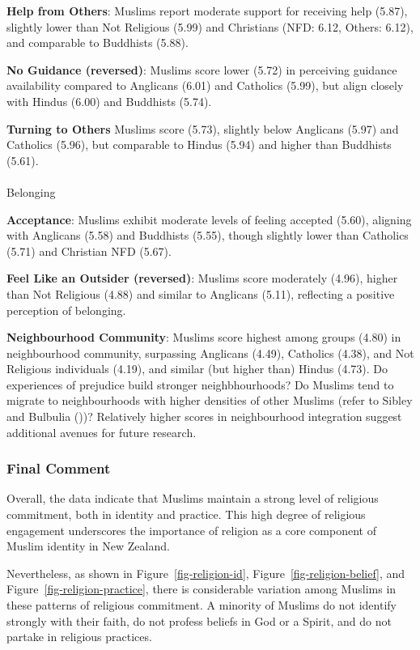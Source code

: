 \documentclass[
  single column]{article}
\makeatletter
\let\oldparagraph\paragraph
\renewcommand{\paragraph}{
    \@ifstar
      \xxxParagraphStar
      \xxxParagraphNoStar
  }
\newcommand{\xxxParagraphStar}[1]{\oldparagraph*{#1}\mbox{}}
\newcommand{\xxxParagraphNoStar}[1]{\oldparagraph{#1}\mbox{}}
\makeatother
\begin{document}
\textbf{Help from Others}: Muslims report moderate support for receiving
help (5.87), slightly lower than Not Religious (5.99) and Christians
(NFD: 6.12, Others: 6.12), and comparable to Buddhists (5.88).

\textbf{No Guidance (reversed)}: Muslims score lower (5.72) in
perceiving guidance availability compared to Anglicans (6.01) and
Catholics (5.99), but align closely with Hindus (6.00) and Buddhists
(5.74).

\textbf{Turning to Others} Muslims score (5.73), slightly below
Anglicans (5.97) and Catholics (5.96), but comparable to Hindus (5.94)
and higher than Buddhists (5.61).

\paragraph{Belonging}\label{belonging}

\textbf{Acceptance}: Muslims exhibit moderate levels of feeling accepted
(5.60), aligning with Anglicans (5.58) and Buddhists (5.55), though
slightly lower than Catholics (5.71) and Christian NFD (5.67).

\textbf{Feel Like an Outsider (reversed)}: Muslims score moderately
(4.96), higher than Not Religious (4.88) and similar to Anglicans
(5.11), reflecting a positive perception of belonging.

\textbf{Neighbourhood Community}: Muslims score highest among groups
(4.80) in neighbourhood community, surpassing Anglicans (4.49),
Catholics (4.38), and Not Religious individuals (4.19), and similar (but
higher than) Hindus (4.73). Do experiences of prejudice build stronger
neighbhourhoods? Do Muslims tend to migrate to neighbourhoods with
higher densities of other Muslims (refer to Sibley and Bulbulia
())? Relatively higher scores
in neighbourhood integration suggest additional avenues for future
research.

\subsubsection{Final Comment}\label{final-comment}

Overall, the data indicate that Muslims maintain a strong level of
religious commitment, both in identity and practice. This high degree of
religious engagement underscores the importance of religion as a core
component of Muslim identity in New Zealand.

Nevertheless, as shown in Figure~\ref{fig-religion-id},
Figure~\ref{fig-religion-belief}, and
Figure~\ref{fig-religion-practice}, there is considerable variation
among Muslims in these patterns of religious commitment. A minority of
Muslims do not identify strongly with their faith, do not profess
beliefs in God or a Spirit, and do not partake in religious practices.
\end{document}
